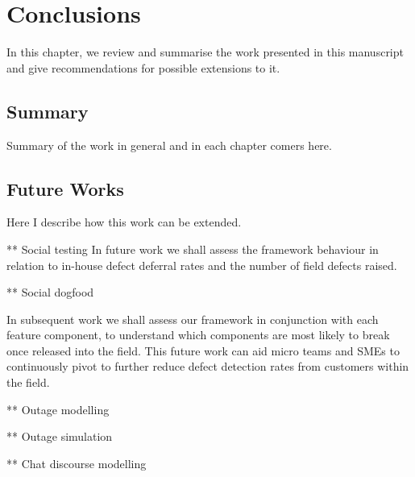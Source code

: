 
\chapter{Conclusions}\label{ch:conc} %

\begin{textsl}
{\small In this chapter, we review and summarise the work presented in this manuscript and give
recommendations for possible extensions to it.}
\end{textsl}

\vspace*{1cm}

\section{Summary}
Summary of the work in general and in each chapter comers here.

\section{Future Works}
Here I describe how this work can be extended.

** Social testing
In future work we shall assess the framework behaviour in relation to in-house defect deferral rates and the number of field defects raised.


** Social dogfood

In subsequent work we shall assess our framework in conjunction with each feature component, to understand which
components are most likely to break once released into the field. This future work can aid micro teams and SMEs to
continuously pivot to further reduce defect detection rates from customers within the field. \par

** Outage modelling


** Outage simulation


** Chat discourse modelling

